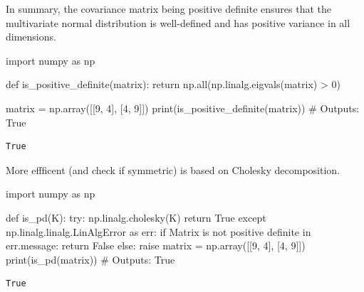 \documentclass[
  letterpaper,
  DIV=11,
  numbers=noendperiod]{scrreprt}
\newenvironment{Shaded}{\begin{snugshade}}{\end{snugshade}}
\newcommand{\BuiltInTok}[1]{\textcolor[rgb]{0.00,0.23,0.31}{#1}}
\newcommand{\CommentTok}[1]{\textcolor[rgb]{0.37,0.37,0.37}{#1}}
\newcommand{\ControlFlowTok}[1]{\textcolor[rgb]{0.00,0.23,0.31}{#1}}
\newcommand{\DecValTok}[1]{\textcolor[rgb]{0.68,0.00,0.00}{#1}}
\newcommand{\ImportTok}[1]{\textcolor[rgb]{0.00,0.46,0.62}{#1}}
\newcommand{\KeywordTok}[1]{\textcolor[rgb]{0.00,0.23,0.31}{#1}}
\newcommand{\NormalTok}[1]{\textcolor[rgb]{0.00,0.23,0.31}{#1}}
\newcommand{\OperatorTok}[1]{\textcolor[rgb]{0.37,0.37,0.37}{#1}}
\newcommand{\StringTok}[1]{\textcolor[rgb]{0.13,0.47,0.30}{#1}}
\newcommand{\VariableTok}[1]{\textcolor[rgb]{0.07,0.07,0.07}{#1}}
\begin{document}
In summary, the covariance matrix being positive definite ensures that
the multivariate normal distribution is well-defined and has positive
variance in all dimensions.

\begin{Shaded}
\begin{Highlighting}[]
\ImportTok{import}\NormalTok{ numpy }\ImportTok{as}\NormalTok{ np}

\KeywordTok{def}\NormalTok{ is\_positive\_definite(matrix):}
    \ControlFlowTok{return}\NormalTok{ np.}\BuiltInTok{all}\NormalTok{(np.linalg.eigvals(matrix) }\OperatorTok{\textgreater{}} \DecValTok{0}\NormalTok{)}

\NormalTok{matrix }\OperatorTok{=}\NormalTok{ np.array([[}\DecValTok{9}\NormalTok{, }\DecValTok{4}\NormalTok{], [}\DecValTok{4}\NormalTok{, }\DecValTok{9}\NormalTok{]])}
\BuiltInTok{print}\NormalTok{(is\_positive\_definite(matrix))  }\CommentTok{\# Outputs: True}
\end{Highlighting}
\end{Shaded}

\begin{verbatim}
True
\end{verbatim}

More effficent (and check if symmetric) is based on Cholesky
decomposition.

\begin{Shaded}
\begin{Highlighting}[]
\ImportTok{import}\NormalTok{ numpy }\ImportTok{as}\NormalTok{ np}

\KeywordTok{def}\NormalTok{ is\_pd(K):}
    \ControlFlowTok{try}\NormalTok{:}
\NormalTok{        np.linalg.cholesky(K)}
        \ControlFlowTok{return} \VariableTok{True}
    \ControlFlowTok{except}\NormalTok{ np.linalg.linalg.LinAlgError }\ImportTok{as}\NormalTok{ err:}
        \ControlFlowTok{if} \StringTok{\textquotesingle{}Matrix is not positive definite\textquotesingle{}} \KeywordTok{in}\NormalTok{ err.message:}
            \ControlFlowTok{return} \VariableTok{False}
        \ControlFlowTok{else}\NormalTok{:}
            \ControlFlowTok{raise}
\NormalTok{matrix }\OperatorTok{=}\NormalTok{ np.array([[}\DecValTok{9}\NormalTok{, }\DecValTok{4}\NormalTok{], [}\DecValTok{4}\NormalTok{, }\DecValTok{9}\NormalTok{]])}
\BuiltInTok{print}\NormalTok{(is\_pd(matrix))  }\CommentTok{\# Outputs: True}
\end{Highlighting}
\end{Shaded}

\begin{verbatim}
True
\end{verbatim}
\end{document}
